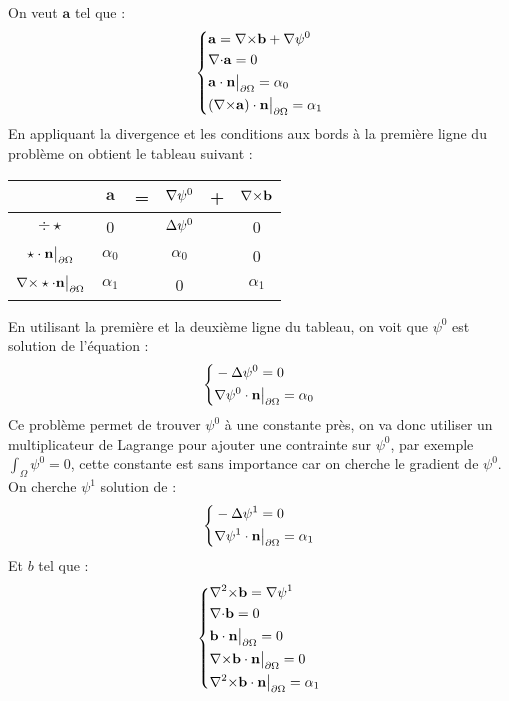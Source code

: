On veut $\mathbf{a}$ tel que :
\begin{equation}
\label{a}
\left\{
\begin{aligned}
&\mathbf{a}={\nabla\times} \mathbf{b}+{\nabla}\psi^0\\
&{\nabla\cdot} \mathbf{a} =0\\
&\mathbf{a}\cdot \mathbf{n}{\big\rvert_{\partial\Omega}} = \alpha_0\\
&({\nabla\times} \mathbf{a})\cdot \mathbf{n}{\big\rvert_{\partial\Omega}} = \alpha_1
\end{aligned}
\right.
\end{equation}
En appliquant la divergence et les conditions aux bords à la première ligne du problème on obtient le tableau suivant :
\begin{center}
\begin{tabular}{c|ccccc}
& $\mathbf{a}$ & = & ${\nabla}\psi^0$ & + & ${\nabla\times} \mathbf{b}$ \\ \hline
$\div\star$ & 0 & & ${\Delta}\psi^0$ & & 0\\ \hline
$\star\cdot \mathbf{n}{\big\rvert_{\partial\Omega}}$ & $\alpha_0$ & & $\alpha_0$ & & 0\\ \hline
${\nabla\times}\star\cdot \mathbf{n}{\big\rvert_{\partial\Omega}}$ & $\alpha_1$ & & 0 & & $\alpha_1$
\end{tabular}
\end{center}
En utilisant la première et la deuxième ligne du tableau, on voit que $\psi^0$ est solution de l'équation :
\begin{equation}
\label{psi0}
\left\{
\begin{aligned}
&-{\Delta}\psi^0 = 0\\
&{\nabla}\psi^0\cdot \mathbf{n}{\big\rvert_{\partial\Omega}}=\alpha_0
\end{aligned}
\right.
\end{equation}
Ce problème permet de trouver $\psi^0$ à une constante près, on va donc utiliser un multiplicateur de Lagrange pour ajouter une contrainte sur $\psi^0$, par exemple $\int_\Omega \psi^0 = 0$, cette constante est sans importance car on cherche le gradient de $\psi^0$.\\

On cherche $\psi^1$ solution de :
\begin{equation}
\label{psi1}
\left\{
\begin{aligned}
&-{\Delta}\psi^1 = 0\\
&{\nabla}\psi^1\cdot \mathbf{n}{\big\rvert_{\partial\Omega}}=\alpha_1
\end{aligned}
\right.
\end{equation}
Et $b$ tel que :
\begin{equation}
\label{curlb}
\left\{
\begin{aligned}
&{\nabla^2\times} \mathbf{b} = {\nabla}\psi^1\\
&{\nabla\cdot} \mathbf{b} = 0\\
&\mathbf{b}\cdot \mathbf{n}{\big\rvert_{\partial\Omega}} = 0\\
&{\nabla\times} \mathbf{b}\cdot \mathbf{n}{\big\rvert_{\partial\Omega}} = 0\\
&{\nabla^2\times} \mathbf{b}\cdot \mathbf{n}{\big\rvert_{\partial\Omega}} = \alpha_1
\end{aligned}
\right.
\end{equation}


